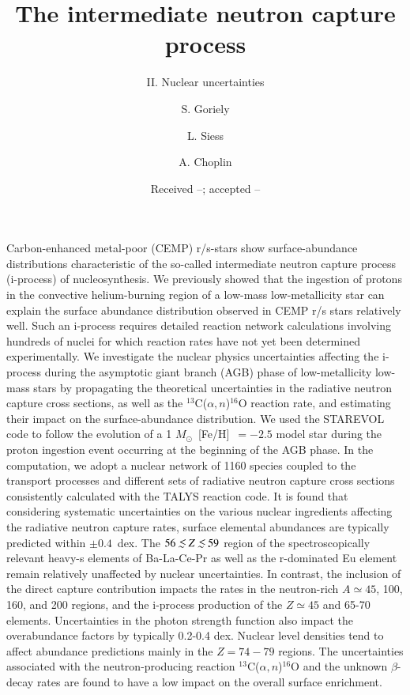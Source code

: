 \documentclass{aa}
\def\la{\,\,\raise0.14em\hbox{$<$}\kern-0.76em\lower0.28em\hbox{$\sim$}\,\,}
\def\iso#1{$^{#1}$}
\def\Msun{$M_{\odot}$}
\def\an{$\alpha,n$}
\begin{document}
\title{The intermediate neutron capture process}
\subtitle{II. Nuclear uncertainties}

\author{S. Goriely
\and L. Siess
\and A. Choplin}


\date{Received --; accepted --}

\abstract
{
Carbon-enhanced metal-poor (CEMP) r/s-stars show surface-abundance distributions characteristic of the so-called intermediate neutron capture process (i-process) of nucleosynthesis. 
We previously showed that the ingestion of protons in the convective helium-burning region of a low-mass low-metallicity star can explain the surface abundance distribution observed in  CEMP r/s stars relatively well. Such an i-process requires detailed reaction network calculations involving hundreds of nuclei for which reaction rates have not yet been determined experimentally.
}
{
We investigate the nuclear physics uncertainties affecting the  i-process during the asymptotic giant branch (AGB) phase of low-metallicity low-mass stars by propagating the theoretical uncertainties in the radiative neutron capture cross sections, as well as the  \iso{13}C(\an)\iso{16}O reaction rate, and estimating their impact on the surface-abundance distribution.
}
{
We used the {\sf STAREVOL} code to follow the evolution of a 1 \Msun\ [Fe/H]~$=-2.5$  model star during the proton ingestion event occurring at the beginning of the AGB phase. In the computation, we adopt a nuclear network of 1160 species coupled to the transport processes and different sets of radiative neutron capture cross sections consistently calculated with the  {\sf TALYS} reaction code. 
}
{
It is found that considering  systematic uncertainties on the various nuclear ingredients affecting the radiative neutron capture rates, surface elemental abundances are typically predicted within $\pm 0.4$~dex. The  $56 \la Z \la 59$ region of the spectroscopically relevant heavy-s elements of Ba-La-Ce-Pr as well as the r-dominated Eu element remain relatively unaffected by nuclear uncertainties. In contrast, the inclusion of the direct capture contribution impacts the rates in the neutron-rich $A\simeq 45$, 100, 160, and 200 regions, and the i-process production of the $Z\simeq 45$ and 65-70 elements. Uncertainties in the photon strength function also impact the overabundance factors by typically 0.2-0.4 dex. Nuclear level densities tend to affect abundance predictions mainly in the $Z=74-79$ regions.
The uncertainties associated with the neutron-producing reaction \iso{13}C(\an)\iso{16}O and the unknown $\beta$-decay rates are found to have a low impact on the overall surface enrichment.
}
\end{document}
